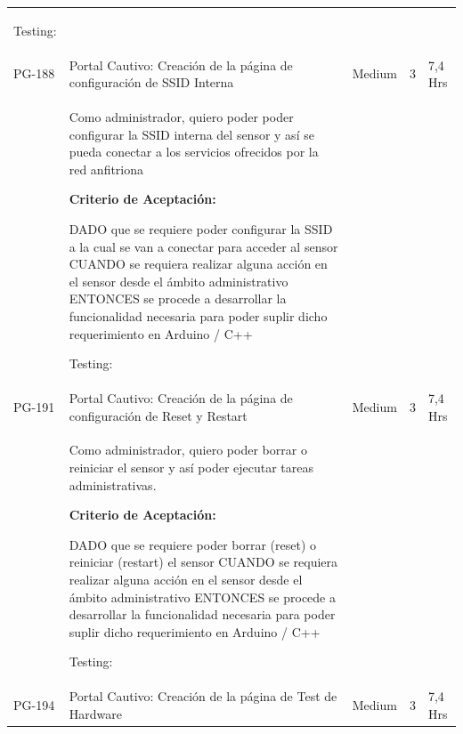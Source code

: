 \documentclass[11pt]{charter}
\begin{document}
\begin{landscape}
\begin{tabularx}{\linewidth}{@{}|p{1.3cm}|p{17cm}|p{1.7cm}|p{1.5cm}|p{1.7cm}|@{}}
\begin{description}
                   \item Testing:
            \end{description}          &  &     & \\
PG-188   & Portal Cautivo: Creación de la   página de configuración de SSID Interna             & Medium             & 3   & 7,4  Hrs          \\
         &  \begin{description}                 
                   \item Como administrador, quiero poder   poder configurar la SSID interna del sensor y así se pueda conectar a los   servicios ofrecidos por la red anfitriona                 
                   \item \textbf{Criterio de Aceptación:}                 
                   \item DADO que se requiere poder configurar la SSID a la cual se van a conectar   para acceder al sensor CUANDO se requiera realizar alguna acción en el sensor desde el ámbito   administrativo ENTONCES se procede a desarrollar la funcionalidad necesaria para poder   suplir dicho requerimiento en Arduino / C++                
                   \item Testing:
            \end{description}              &  &     & \\
PG-191   & Portal Cautivo: Creación de la   página de configuración de Reset y Restart          & Medium             & 3   & 7,4  Hrs          \\
         &  \begin{description}                 
                   \item Como administrador, quiero poder   borrar o reiniciar el sensor y así poder ejecutar tareas   administrativas.                 
                   \item \textbf{Criterio de Aceptación:}
				   \item DADO que se requiere poder borrar (reset) o reiniciar (restart) el   sensor CUANDO se requiera realizar alguna acción en el sensor desde el ámbito   administrativo ENTONCES se procede a desarrollar la funcionalidad necesaria para poder   suplir dicho requerimiento en Arduino / C++                
                   \item Testing:
            \end{description}       &  &     & \\
PG-194   & Portal Cautivo: Creación de la   página de Test de Hardware        & Medium             & 3   & 7,4  Hrs          \\

\end{tabularx}
\end{landscape}
\end{document}
